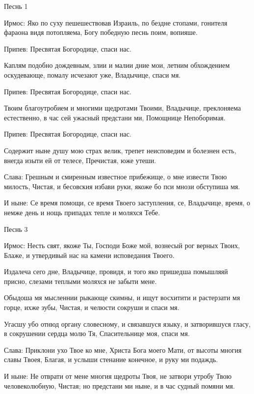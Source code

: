 \bfseries \itshape 


Песнь 1\normalfont{}\normalfont{}


Ирмос: Яко по суху пешешествовав Израиль, по бездне стопами, гонителя фараона видя потопляема, Богу победную песнь поим, вопияше.





Припев: Пресвятая Богородице, спаси нас.


Каплям подобно дождевным, злии и малии дние мои, летним обхождением оскудевающе, помалу исчезают уже, Владычице, спаси мя.


Припев: Пресвятая Богородице, спаси нас.


Твоим благоутробием и многими щедротами Твоими, Владычице, преклоняема естественно, в час сей ужасный предстани ми, Помощнице Непоборимая.


Припев: Пресвятая Богородице, спаси нас.


Содержит ныне душу мою страх велик, трепет неисповедим и болезнен есть, внегда изыти ей от телесе, Пречистая, юже утеши.


Слава: Грешным и смиренным известное прибежище, о мне извести Твою милость, Чистая, и бесовския избави руки, якоже бо пси мнози обступиша мя.


И ныне: Се время помощи, се время Твоего заступления, се, Владычице, время, о немже день и нощь припадах тепле и моляхся Тебе.


\bfseries \itshape 


Песнь 3\normalfont{}\normalfont{}


Ирмос: Несть свят, якоже Ты, Господи Боже мой, вознесый рог верных Твоих, Блаже, и утвердивый нас на камени исповедания Твоего.





Издалеча сего дне, Владычице, провидя, и того яко пришедша помышляяй присно, слезами теплыми моляхся не забыти мене.


Обыдоша мя мысленнии рыкающе скимны, и ищут восхитити и растерзати мя горце, ихже зубы, Чистая, и челюсти сокруши и спаси мя.


Угасшу убо отнюд органу словесному, и связавшуся языку, и затворившуся гласу, в сокрушении сердца молю Тя, Спасительнице моя, спаси мя.


Слава: Приклони ухо Твое ко мне, Христа Бога моего Мати, от высоты многия славы Твоея, Благая, и услыши стенание конечное, и руку ми подаждь.


И ныне: Не отврати от мене многия щедроты Твоя, не затвори утробу Твою человеколюбную, Чистая; но предстани ми ныне, и в час судный помяни мя.


